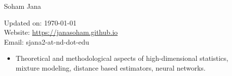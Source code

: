 \documentclass[letterpaper,12pt,oneside]{article}
\theoremstyle{definition}
\begin{document}
			
			
			\noindent  \Huge{Soham Jana} \\
			\vspace{1ex} 
			\normalsize
			
			\hfill
			\begin{minipage}{2.7in}
				Updated on: \today\\
				Website: \href{https://janasoham.github.io/}{https://janasoham.github.io}\\
				Email: {sjana2-at-nd-dot-edu}\\
			\end{minipage}
			\vspace{0.4cm}
			
			
			
			
			
			
			\begin{itemize}
				\item[] Theoretical and methodological aspects of high-dimensional statistics, mixture modeling, distance based estimators, neural networks.
			\end{itemize}
			
			
\end{document}
